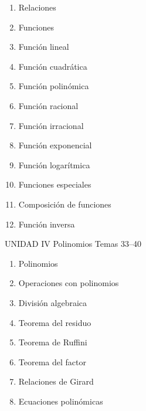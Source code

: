 \begin{multicols}{2}
  \begin{enumerate}[label=\textcolor{AzulPizarra}{\textbf{\arabic*.}},
      leftmargin=2em, itemsep=1pt, start=21]
    \item Relaciones
    \item Funciones
    \item Función lineal
    \item Función cuadrática
    \item Función polinómica
    \item Función racional
    \item Función irracional
    \item Función exponencial
    \item Función logarítmica
    \item Funciones especiales
    \item Composición de funciones
    \item Función inversa
  \end{enumerate}
\end{multicols}

\vspace{0.4cm}

\begin{tcolorbox}[
    enhanced,
    colback   = AzulMedio,
    colframe  = DoradoAcadémico,
    arc = 3pt, boxrule = 1pt,
    left = 8pt, right = 8pt, top = 5pt, bottom = 5pt,
    fontupper = \sffamily\bfseries\color{white}
  ]
  UNIDAD IV \hfill Polinomios \hfill Temas 33–40
\end{tcolorbox}

\begin{multicols}{2}
  \begin{enumerate}[label=\textcolor{AzulMedio}{\textbf{\arabic*.}},
      leftmargin=2em, itemsep=1pt, start=33]
    \item Polinomios
    \item Operaciones con polinomios
    \item División algebraica
    \item Teorema del residuo
    \item Teorema de Ruffini
    \item Teorema del factor
    \item Relaciones de Girard
    \item Ecuaciones polinómicas
  \end{enumerate}
\end{multicols}

